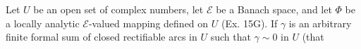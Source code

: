 Let $U$ be an open set of complex numbers, let $\mathcal{E}$ be a Banach space, and let $\Phi$ be a locally analytic $\mathcal{E}$-valued mapping defined on $U$ (Ex. 15G). If $\gamma$ is an arbitrary finite formal sum of closed rectifiable arcs in $U$ such that $\gamma \sim 0$ in $U$ (that
